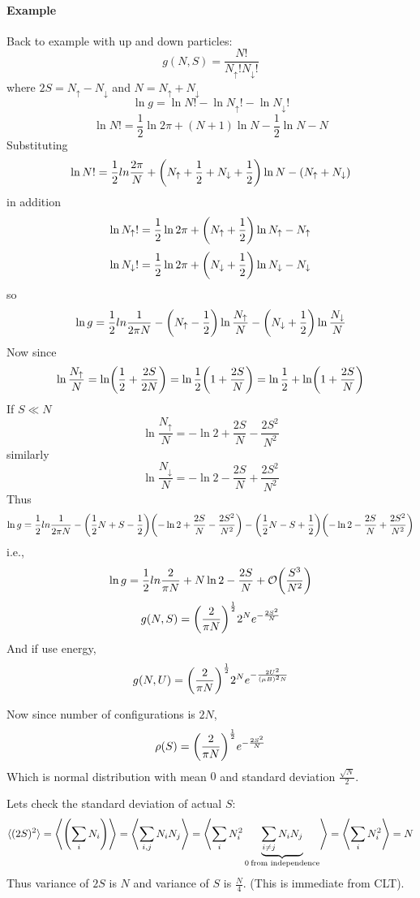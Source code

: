 \paragraph{Example}
Back to example with up and down particles:
$$g(N,S) = \frac{N!}{N_{\uparrow}!N_\downarrow!}$$
where $2S = N_\uparrow - N_\downarrow$ and $N= N_\uparrow + N_\downarrow$
$$\ln g = \ln N! - \ln N_\uparrow ! - \ln N_\downarrow!$$
$$\ln N! = \frac{1}{2} \ln 2\pi + (N+1) \ln N - \frac{1}{2} \ln N - N$$
Substituting
$$\ln N! = \frac{1}{2}ln \frac{2\pi}{N} + \qty(N_\uparrow + \frac{1}{2} + N_\downarrow + \frac{1}{2}) \ln N - (N_\uparrow + N_\downarrow)$$
in addition
$$\ln N_\uparrow! = \frac{1}{2} \ln 2\pi + \qty(N_\uparrow + \frac{1}{2}) \ln N_\uparrow - N_\uparrow$$
$$\ln N_\downarrow! = \frac{1}{2} \ln 2\pi + \qty(N_\downarrow + \frac{1}{2}) \ln N_\downarrow - N_\downarrow$$
so
$$\ln g = \frac{1}{2}ln \frac{1}{2\pi N}  - \qty(N_\uparrow - \frac{1}{2}) \ln \frac{N_\uparrow}{N}   - \qty(N_\downarrow + \frac{1}{2}) \ln \frac{N_\downarrow}{N} $$
Now since
$$\ln \frac{N_\uparrow}{N} = \ln(\frac{1}{2} + \frac{2S}{2N}) = \ln\frac{1}{2}\qty(1 + \frac{2S}{N}) = \ln \frac{1}{2} + \ln(1+\frac{2S}{N})$$
If $S \ll N$
$$\ln \frac{N_\uparrow}{N}  = -\ln 2 + \frac{2S}{N} - \frac{2S^2}{N^2}$$
similarly
$$\ln \frac{N_\downarrow}{N}  = -\ln 2 - \frac{2S}{N} + \frac{2S^2}{N^2}$$
Thus
$$\ln g = \frac{1}{2}ln \frac{1}{2\pi N}  - \qty(\frac{1}{2}N + S - \frac{1}{2}) \qty(-\ln 2 + \frac{2S}{N} - \frac{2S^2}{N^2})  - \qty(\frac{1}{2}N - S + \frac{1}{2}) \qty(-\ln 2 - \frac{2S}{N} +  \frac{2S^2}{N^2}) $$
i.e.,
$$\ln g = \frac{1}{2}ln \frac{2}{\pi N}  + N \ln 2 -\frac{2S}{N} + \order{\frac{S^3}{N^2}}$$
$$g(N,S) = \qty(\frac{2}{\pi N})^{\frac{1}{2}} 2^N e^{-\frac{2S^2}{N}}$$
And if use energy,
$$g(N, U) = \qty(\frac{2}{\pi N})^{\frac{1}{2}} 2^N e^{-\frac{2U^2}{(\mu B)^2N}}$$

Now since number of configurations is $2N$, 
$$\rho(S) = \qty(\frac{2}{\pi N})^{\frac{1}{2}} e^{-\frac{2S^2}{N}} $$
Which is normal distribution with mean $0$ and standard deviation $\frac{\sqrt{N}}{2}$.

Lets check the standard deviation of actual $S$:
$$\langle (2S)^2 \rangle = \left\langle \qty(\sum_i N_i) \right\rangle = \left\langle \sum_{i,j} N_iN_j \right\rangle = \left\langle \sum_i N_i^2 \underbrace{\sum_{i\neq j} N_iN_j}_{0 \: \text{from independence}} \right\rangle  =\left\langle \sum_i N_i^2\right\rangle = N$$
Thus variance of $2S$ is $N$ and variance of $S$ is $\frac{N}{4}$. (This is immediate from CLT).
